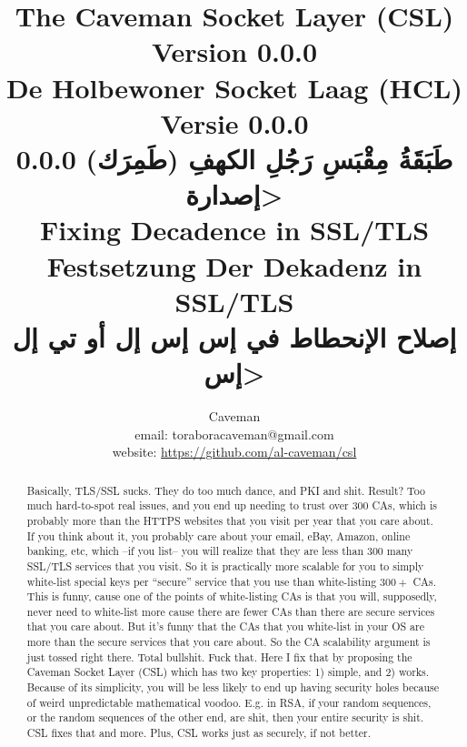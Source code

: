 \documentclass{article}
\author{Caveman\\
email: toraboracaveman@gmail.com\\
website: \url{https://github.com/al-caveman/csl}}
\title{The Caveman Socket Layer (CSL) Version 0.0.0\\
De Holbewoner Socket Laag (HCL) Versie 0.0.0\\
0.0.0 \<طَبَقَةُ مِقْبَسِ رَجُلِ الكهفِ (طَمِرَك) إصدارة>\\
{\large Fixing Decadence in SSL/TLS}\\
{\large Festsetzung Der Dekadenz in SSL/TLS}\\
{\large \<إصلاح الإنحطاط في إس إس إل أو تي إل إس>}}
\begin{document}
 \maketitle
\begin{abstract}
    Basically, TLS/SSL sucks. They do too much dance, and PKI and shit. Result?
    Too much hard-to-spot real issues, and you end up needing to trust over
    $300$ CAs, which is probably more than the HTTPS websites that you visit
    per year that you care about. If you think about it, you probably care
    about your email, eBay, Amazon, online banking, etc, which --if you list--
    you will realize that they are less than $300$ many SSL/TLS services that
    you visit. So it is practically more scalable for you to simply white-list
    special keys per ``secure'' service that you use than white-listing $300+$
    CAs. This is funny, cause one of the points of white-listing CAs is that
    you will, supposedly, never need to white-list more cause there are fewer
    CAs than there are secure services that you care about. But it's funny that
    the CAs that you white-list in your OS are more than the secure services
    that you care about. So the CA scalability argument is just tossed right
    there. Total bullshit. Fuck that. Here I fix that by proposing the Caveman
    Socket Layer (CSL) which has two key properties: 1) simple, and 2) works.
    Because of its simplicity, you will be less likely to end up having
    security holes because of weird unpredictable mathematical voodoo. E.g. in
    RSA, if your random sequences, or the random sequences of the other end,
    are shit, then your entire security is shit.  CSL fixes that and more.
    Plus, CSL works just as securely, if not better.
\end{abstract}
\end{document}
